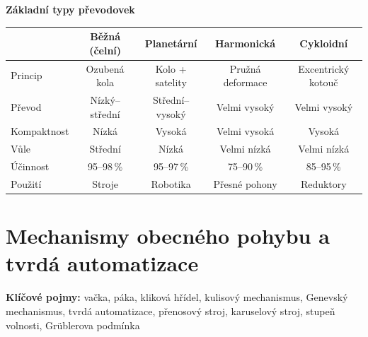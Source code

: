 \documentclass[a4paper,10pt]{article}
\begin{document}
\begin{vysvetlenibox}
\textbf{Základní typy převodovek}
\begin{center}
\begin{tabular}{|l|c|c|c|c|}
\hline
 & Běžná (čelní) & Planetární & Harmonická & Cykloidní \\
\hline
Princip & Ozubená kola & Kolo + satelity & Pružná deformace & Excentrický kotouč \\
\hline
Převod & Nízký--střední & Střední--vysoký & Velmi vysoký & Velmi vysoký \\
\hline
Kompaktnost & Nízká & Vysoká & Velmi vysoká & Vysoká \\
\hline
Vůle & Střední & Nízká & Velmi nízká & Velmi nízká \\
\hline
Účinnost & 95--98\,\% & 95--97\,\% & 75--90\,\% & 85--95\,\% \\
\hline
Použití & Stroje & Robotika & Přesné pohony & Reduktory \\
\hline
\end{tabular}
\end{center}

\end{vysvetlenibox}



\newpage

\section{Mechanismy obecného pohybu a tvrdá automatizace}

\begin{pojmybox}
\textbf{Klíčové pojmy:}
vačka, páka, kliková hřídel, kulisový mechanismus, Genevský mechanismus,
tvrdá automatizace, přenosový stroj, karuselový stroj, stupeň volnosti,
Grüblerova podmínka
\end{pojmybox}
\end{document}
